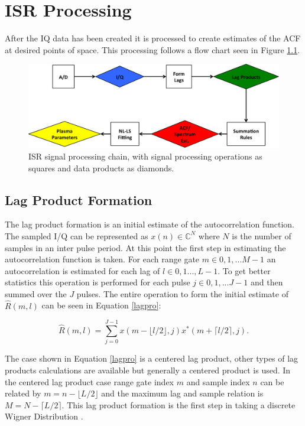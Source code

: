 \documentclass[10pt]{report}
\begin{document}
\chapter{ISR Processing}

After the IQ data has been created it is processed to create estimates of the ACF at desired points of space. This processing follows a flow chart seen in Figure \ref{fig:chain}.

\begin{figure}[!t]
\centering
\includegraphics[width=6in]{datastackchain}
\caption{ISR signal processing chain, with signal processing operations as squares and data products as diamonds.}
\label{fig:chain}
\end{figure}



\section{Lag Product Formation}
The lag product formation is an initial estimate of the autocorrelation function.  The sampled I/Q can be represented as $x(n) \in\mathbb{C}^N$ where $N$ is the number of samples in an inter pulse period.  At this point the first step in estimating the autocorrelation function is taken.  For each range gate $m\in 0,1,...M-1$ an autocorrelation is estimated for each lag of $l \in 0,1...,L-1$.  To get better statistics this operation is performed for each pulse $j\in 0,1,...J-1$ and then summed over the $J$ pulses.  The entire operation to form the initial estimate of $\hat{R}(m,l)$ can be seen in Equation \ref{lagpro}:

\begin{equation}
\label{lagpro}
\hat{R}(m,l) = \displaystyle\sum\limits_{j=0}^{J-1} x(m-\lfloor l/2\rfloor,j)x^*(m+\lceil l/2 \rceil,j).
\end{equation}

The case shown in Equation \ref{lagpro} is a centered lag product, other types of lag products calculations are available but generally a centered product is used. In the centered lag product case range gate index $m$ and sample index $n$ can be related by $m=n-\lfloor L/2\rfloor$ and the maximum lag and sample relation is $M=N-\lceil L/2 \rceil$.  This lag product formation is the first step in taking a discrete Wigner Distribution \cite{TFAcohen}.
\end{document}
